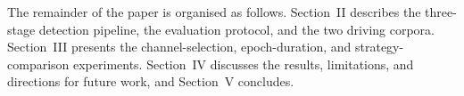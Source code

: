 The remainder of the paper is organised as follows. Section~II describes the three-stage detection pipeline, the evaluation protocol, and the two driving corpora. Section~III presents the channel-selection, epoch-duration, and strategy-comparison experiments. Section~IV discusses the results, limitations, and directions for future work, and Section~V concludes.
